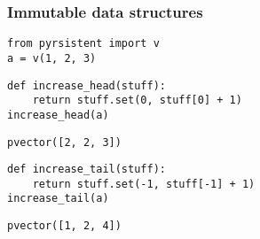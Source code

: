 \begin{frame}[fragile]
\frametitle{Immutable data structures}

\begin{lstlisting}[frame=single]
from pyrsistent import v
a = v(1, 2, 3)
\end{lstlisting}

\begin{lstlisting}[frame=single]
def increase_head(stuff):
    return stuff.set(0, stuff[0] + 1)
increase_head(a)
\end{lstlisting}

\begin{lstlisting}[frame=single]
pvector([2, 2, 3])
\end{lstlisting}

\begin{lstlisting}[frame=single]
def increase_tail(stuff):
    return stuff.set(-1, stuff[-1] + 1)
increase_tail(a)
\end{lstlisting}

\begin{lstlisting}[frame=single]
pvector([1, 2, 4])
\end{lstlisting}

\end{frame}
%
%
%
%
%
%
%
%
%
%
%
%
